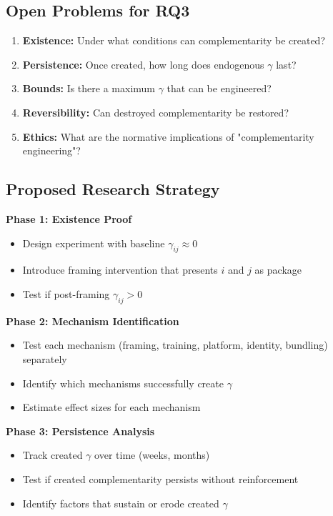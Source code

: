 \subsection{Open Problems for RQ3}

\begin{enumerate}
    \item \textbf{Existence:} Under what conditions can complementarity be created?

    \item \textbf{Persistence:} Once created, how long does endogenous $\gamma$ last?

    \item \textbf{Bounds:} Is there a maximum $\gamma$ that can be engineered?

    \item \textbf{Reversibility:} Can destroyed complementarity be restored?

    \item \textbf{Ethics:} What are the normative implications of "complementarity engineering"?
\end{enumerate}

\subsection{Proposed Research Strategy}

\begin{tcolorbox}[colback=green!5!white,colframe=green!75!black,title=\textbf{Research Protocol for RQ3}]
\textbf{Phase 1: Existence Proof}
\begin{itemize}[noitemsep]
    \item Design experiment with baseline $\gamma_{ij} \approx 0$
    \item Introduce framing intervention that presents $i$ and $j$ as package
    \item Test if post-framing $\gamma_{ij} > 0$
\end{itemize}

\textbf{Phase 2: Mechanism Identification}
\begin{itemize}[noitemsep]
    \item Test each mechanism (framing, training, platform, identity, bundling) separately
    \item Identify which mechanisms successfully create $\gamma$
    \item Estimate effect sizes for each mechanism
\end{itemize}

\textbf{Phase 3: Persistence Analysis}
\begin{itemize}[noitemsep]
    \item Track created $\gamma$ over time (weeks, months)
    \item Test if created complementarity persists without reinforcement
    \item Identify factors that sustain or erode created $\gamma$
\end{itemize}
\end{tcolorbox}

